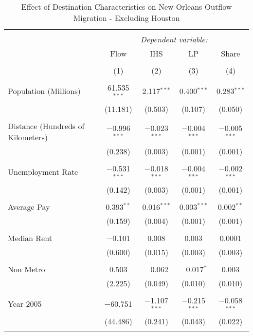 \documentclass[]{article}
\begin{document}
\begin{table}[!htbp] \centering 
  \caption{\label{reg:regnoho}Effect of Destination Characteristics on New Orleans Outflow Migration - Excluding Houston} 
  \label{} 
\scriptsize 
\begin{tabular}{@{\extracolsep{5pt}}lcccc} 
\\[-1.8ex]\hline 
\hline \\[-1.8ex] 
 & \multicolumn{4}{c}{\textit{Dependent variable:}} \\ 
\cline{2-5} 
 & Flow & IHS & LP & Share \\ 
\\[-1.8ex] & (1) & (2) & (3) & (4)\\ 
\hline \\[-1.8ex] 
 Population (Millions) & 61.535$^{***}$ & 2.117$^{***}$ & 0.400$^{***}$ & 0.283$^{***}$ \\ 
  & (11.181) & (0.503) & (0.107) & (0.050) \\ 
  & & & & \\ 
 Distance (Hundreds of Kilometers) & $-$0.996$^{***}$ & $-$0.023$^{***}$ & $-$0.004$^{***}$ & $-$0.005$^{***}$ \\ 
  & (0.238) & (0.003) & (0.001) & (0.001) \\ 
  & & & & \\ 
 Unemployment Rate & $-$0.531$^{***}$ & $-$0.018$^{***}$ & $-$0.004$^{***}$ & $-$0.002$^{***}$ \\ 
  & (0.142) & (0.003) & (0.001) & (0.001) \\ 
  & & & & \\ 
 Average Pay & 0.393$^{**}$ & 0.016$^{***}$ & 0.003$^{***}$ & 0.002$^{**}$ \\ 
  & (0.159) & (0.004) & (0.001) & (0.001) \\ 
  & & & & \\ 
 Median Rent & $-$0.101 & 0.008 & 0.003 & 0.0001 \\ 
  & (0.600) & (0.015) & (0.003) & (0.003) \\ 
  & & & & \\ 
 Non Metro & 0.503 & $-$0.062 & $-$0.017$^{*}$ & 0.003 \\ 
  & (2.225) & (0.049) & (0.010) & (0.010) \\ 
  & & & & \\ 
 Year 2005 & $-$60.751 & $-$1.107$^{***}$ & $-$0.215$^{***}$ & $-$0.058$^{***}$ \\ 
  & (44.486) & (0.241) & (0.043) & (0.022) \\ 
  & & & & \\ 

\end{tabular}
\end{table}
\end{document}
